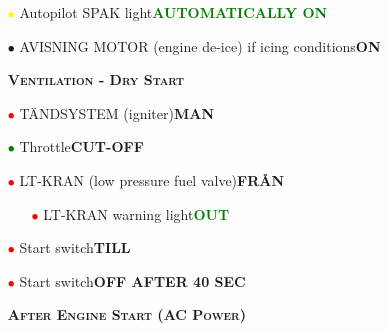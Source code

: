 \documentclass[a4paper,12pt,dvipsnames]{letter}
\newcommand{\rotb}[1]{\textcolor{red}  {\textbf{#1}}}
\newcommand{\oranb}[1]{\textcolor{BurntOrange} {\textbf{#1}}}
\newcommand{\button}[1]{\textbf{#1}}
\newcommand{\degC}{\textdegree{}C}
\newcommand{\ok}[1]{\textcolor{Green}{\textbf{#1}}}
\newcommand{\myHead}[1]{{\LARGE\textsc{\textbf{#1}}}}
\newcommand{\myhead}[1]{{\Large\textsc{\textbf{#1}}}}
\newcommand{\bi}{\textcolor{ProcessBlue}{$\bullet$\;}}
\newcommand{\ri}{\textcolor{red}{$\bullet$\;}}
\newcommand{\gi}{\textcolor{Green}{$\bullet$\;}}
\newcommand{\yi}{\textcolor{Yellow}{$\bullet$\;}}
\newcommand{\vi}{\textcolor{Plum}{$\bullet$\;}}
\begin{document}
{\begin{itemize}
\begin{itemize}
  \item[\yi] Engine pressure ratio\dotfill\ok{\textasciitilde{}}
  \item[\bi] Nozzle indicator\dotfill\ok{FULLY OPEN}
  \item[\yi] Max EGT\dotfill\ok{\textless{}\degC}
  \item[\vi] Warning lights\dotfill\button{CHECK}
  \begin{itemize}
   \item[\vi] \rotb{OLJETRYCK} (oil pressure)\dotfill\ok{OUT AFTER MAX 60 SEC}
   \item[\vi] \oranb{BRÄ UPPF} (fuel system)\dotfill\ok{OUT}
   \item[\vi] \oranb{TANK PUMP}\dotfill\ok{OUT}
   \item[\vi] \oranb{STARTSYST} (starter system)\dotfill\ok{OUT @ RPM > 58\%}
   \item[\vi] \oranb{TÄNDSYST} (ignition system)\dotfill\ok{OUT @ RPM > 58\%}
   \item[\vi] \oranb{X-TANK BRÄ} (drop trank)\dotfill\ok{OUT @ RPM > 70\%}
  \end{itemize}
 \end{itemize}
 \item[\yi] Autopilot SPAK light\dotfill\ok{AUTOMATICALLY ON}
 \item[\bi] AVISNING MOTOR (engine de-ice) if icing conditions\dotfill\button{ON}
\end{itemize}
%
\begin{itemize}
 \item[]
 \item[] \myhead{Ventilation - Dry Start}
 \item[\ri] TÄNDSYSTEM (igniter)\dotfill\button{MAN}
 \item[\gi] Throttle\dotfill\button{CUT-OFF}
 \item[\ri] LT-KRAN (low pressure fuel valve)\dotfill\button{FR\AA N}
 \begin{itemize}
  \item[\ri] LT-KRAN warning light\dotfill\ok{OUT}
 \end{itemize}
 \item[\ri] Start switch\dotfill\button{TILL}
 \item[\ri] Start switch\dotfill\button{OFF AFTER 40 SEC}
\end{itemize}
\newpage
\begin{itemize}
 \item[] \myHead{After Engine Start (AC Power)}

\end{itemize}}
\end{document}

